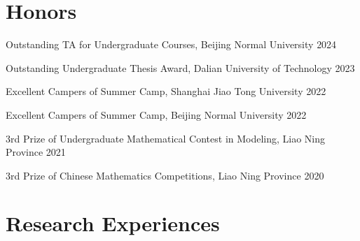 \documentclass[a4paper,11pt]{article}
\newcommand{\resumeItem}[2]{
  \item\small{
    \textbf{#1}{: #2 \vspace{-2pt}}
  }
}
\newcommand{\resumeSubItem}[2]{\resumeItem{#1}{#2}\vspace{-3pt}}
\newcommand{\resumeSubHeadingListStart}{\begin{itemize}[leftmargin=*]}
\newcommand{\resumeSubHeadingListEnd}{\end{itemize}}
\begin{document}
\section{\bfseries{Honors}}
\begin{description}[font=$\bullet$]   
    \item {Outstanding TA for Undergraduate Courses, Beijing Normal University}
    \hfill{2024}
    \vspace{-5pt}
    \item {Outstanding Undergraduate Thesis Award, Dalian University of Technology}
    \hfill{2023}
    \vspace{-5pt}
    \item {Excellent Campers of Summer Camp, Shanghai Jiao Tong University}
    \hfill{2022}
    \vspace{-5pt}
    \item {Excellent Campers of Summer Camp, Beijing Normal University}
    \hfill{2022}
          \vspace{-5pt}
    \item {3rd Prize of Undergraduate Mathematical Contest in Modeling, Liao Ning Province}
    \hfill{2021}
    \vspace{-5pt}
    \item {3rd Prize of Chinese Mathematics Competitions,  Liao Ning Province}
    \hfill{2020}
    \vspace{-5pt}
\end{description}

\vspace{1pt}


\vspace{2pt}
\vspace{2pt}
\section{\bfseries{Research Experiences}}
\end{document}
